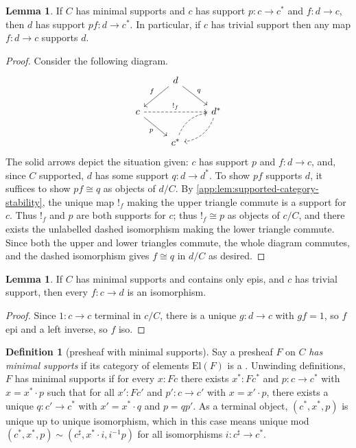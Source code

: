 \documentclass[
  sigconf,
  screen, ]{acmart}
\makeatletter
\theoremstyle{definition}
\newtheorem{lemma}[theorem]{Lemma}
\newtheorem{definition}[theorem]{Definition}
\newcommand{\labelword}[2]{\phantomsection
  #1\def\@currentlabel{\unexpanded{#1}}\label{#2}}
\newcommand\nref[2]{\hyperref[#1]{#2}} \newcommand\checkhigh{{\huge{\color{red}\textbf{TODO: check}}}}
\newcommand\catelts{{\nref{def:catelts}{\mathrm{El}}}}
\makeatother
\begin{document}
\begin{lemma} \label{app:lem:supported-category-mono}
  If $C$ has minimal supports and $c$ has support $p : c\to c^*$
  and $f : d\to c$, then $d$ has support $pf : d\to c^*$.
  In particular, if $c$ has trivial support
  then any map $f : d\to c$ supports $d$.
\end{lemma}
\begin{proof}
  Consider the following diagram.
  \[\begin{tikzcd}
                                               & d \arrow[ld, "f"'] \arrow[rd, "q"] &                                   \\
  c \arrow[rd, "p"'] \arrow[rr, "!_f", dashed] &                                    & d^* \arrow[ld, dashed, bend left] \\
                                               & c^* \arrow[ru, dashed, bend left]  &                                  
  \end{tikzcd}\]
  The solid arrows depict the situation given: $c$ has support $p$
  and $f:d\to c$, and, since $C$ supported, $d$ has some support $q : d\to d^*$.
  To show $pf$ supports $d$, it suffices to show $pf\cong q$ as objects
  of $d/C$.
  By \cref{app:lem:supported-category-stability}, the unique map $!_f$
  making the upper triangle commute is a support for $c$.
  Thus $!_f$ and $p$ are both supports for $c$;
  thus $!_f\cong p$ as objects of $c/C$,
  and there exists the unlabelled dashed isomorphism making
  the lower triangle commute.
  Since both the upper and lower triangles commute, the whole
  diagram commutes, and
  the dashed isomorphism gives $f\cong q$ in $d/C$ as desired.
\end{proof}

\begin{lemma} \label{app:lem:supported-category-epis-iso}
  If $C$ has minimal supports and contains only epis,
  and $c$ has trivial support,
  then every $f : c\to d$ is an isomorphism.
\end{lemma}
\begin{proof}
  Since $1 : c\to c$ terminal in $c/C$, there is a unique
  $g : d\to c$ with $gf = 1$,
  so $f$ epi and a left inverse, so $f$ iso.
\end{proof}

\begin{definition}[presheaf with minimal supports] \label{app:def:supported-sheaf}
  \labelword{Say}{def:catelts} a presheaf $F$ on $C$ \emph{has minimal supports}
  if its category of elements $\catelts(F)$ is a .
  Unwinding definitions, $F$ has minimal supports if for every $x : F c$
  there exists $x^* : F c^*$ and $p :  c\to c^*$
  with $x = x^*\cdot p$
  such that for all
  $x' : F c'$ and $p' :  c\to c'$
  with $x = x'\cdot p$,
  there exists a unique $q :  c'\to c^*$
  with $x' = x^*\cdot q$ 
  and $p = qp'$.
  As a terminal object, $( c^*,x^*,p)$
  is unique up to unique isomorphism,
  which in this case means unique mod
  $( c^*,x^*,p) \sim ( c^\sharp, x^*\cdot i, i^{-1}p)$
  for all isomorphisms $i :  c^\sharp\to  c^*$.
\end{definition}
\end{document}
